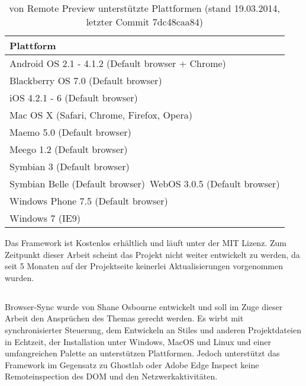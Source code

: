 	\begin{table}[H]
 		\centering
			\begin{tabular}{| p{13cm} |}
			
			\hline
				Plattform\\
			\hline
			\hline
				Android OS 2.1 - 4.1.2 (Default browser + Chrome)\\
				Blackberry OS 7.0 (Default browser)\\
				iOS 4.2.1 - 6 (Default browser)\\
				Mac OS X (Safari, Chrome, Firefox, Opera)\\
				Maemo 5.0 (Default browser)\\
				Meego 1.2 (Default browser)\\
				Symbian 3 (Default browser)\\
				Symbian Belle (Default browser)\
				WebOS 3.0.5 (Default browser)\\
				Windows Phone 7.5 (Default browser)\\	
				Windows 7 (IE9)\\
				\hline
				\end{tabular}
			\caption{von Remote Preview unterstützte Plattformen (stand 19.03.2014, letzter Commit 7dc48caa84)}
	\end{table}
	Das Framework ist Kostenlos erhältlich und läuft unter der MIT Lizenz. Zum Zeitpunkt dieser Arbeit scheint das Projekt nicht 		weiter entwickelt zu werden, da seit 5 Monaten auf der Projektseite keinerlei Aktualisierungen vorgenommen wurden.

		
	\subsection{}
	Browser-Sync wurde von Shane Osbourne entwickelt und soll im Zuge dieser Arbeit den Ansprüchen des Themas gerecht 		werden. Es wirbt mit synchronisierter Steuerung, dem Entwickeln an Stiles und anderen Projektdateien in Echtzeit, der 			Installation unter Windows, MacOS und Linux und einer umfangreichen Palette an unterstützen Plattformen. Jedoch unterstützt 	das Framework im Gegensatz zu Ghostlab oder Adobe Edge Inspect keine Remoteinspection des DOM und den 				Netzwerkaktivitäten.
	

